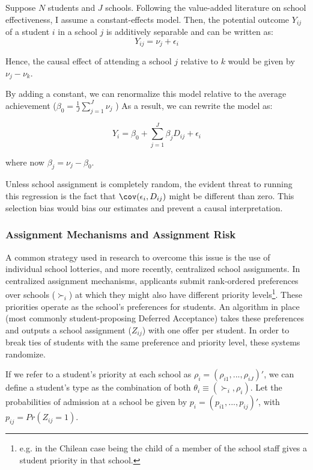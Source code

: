 \documentclass[a4paper, article, english, oneside, unknownkeysallowed, 12pt]{memoir}
\begin{document}
Suppose $N$ students and $J$ schools. 
Following the value-added literature on school effectiveness,  I assume a constant-effects model. Then, the potential outcome $Y_{ij}$ of a student $i$ in a school $j$ is additively separable and can be written as: 
\begin{equation}
  Y_{ij} = \nu_j + \epsilon_i
  \label{linear-separable}
\end{equation}

Hence, the causal effect of attending a school $j$ relative to $k$ would be given by $\nu_j - \nu_k$.


By adding a constant, we can renormalize this model relative to the average achievement ($\beta_0 = \frac{1}{J}\sum_{j=1}^J \nu_j$ )
As a result, we can rewrite the model as: 

\begin{equation}
 Y_i = \beta_0 + \sum_{j=1}^J \beta_j D_{ij} + \epsilon_i 
  \label{base}
\end{equation}

where now $\beta_j = \nu_j - \beta_0$. 

Unless school assignment is completely random, the evident threat to running this regression is the fact that $\cov(\epsilon_i, D_{ij})$ might be different than zero. 
This selection bias would bias our estimates and prevent a causal interpretation.


\subsubsection{Assignment Mechanisms and Assignment Risk}
A common strategy used in research to overcome this issue is the use of individual school lotteries, and more recently, centralized school assignments. 
In centralized assignment mechanisms, applicants submit rank-ordered preferences over schools ($\succ_i$) at which they might also have different priority levels\footnote{e.g. in the Chilean case being the child of a member of the school staff gives a student priority in that school.}.
These priorities operate as the school's preferences for students. An algorithm in place (most commonly student-proposing Deferred Acceptance) takes these preferences and outputs a school assignment ($Z_{ij}$) with one offer per student.
In order to break ties of students with the same preference and priority level, these systems randomize. 

If we refer to a student's priority at each school as $\rho_i = (\rho_{i1}, ...,\rho_{iJ})'$, we can define a student's type as the combination of both $\theta_i \equiv (\succ_i, \rho_i)$.
Let the probabilities of admission at a school be given by $p_i = (p_{i1}, ..., p_{ij})'$, with $p_{ij} = Pr(Z_{ij} = 1)$.
\end{document}
